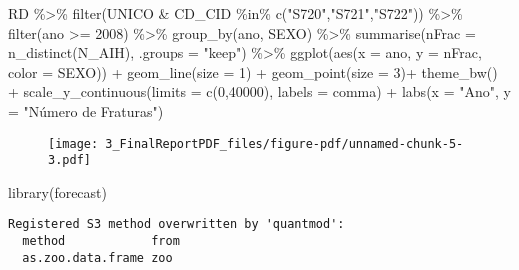 \documentclass[
  letterpaper,
  DIV=11,
  numbers=noendperiod]{scrartcl}
\newenvironment{Shaded}{\begin{snugshade}}{\end{snugshade}}
\newcommand{\AttributeTok}[1]{\textcolor[rgb]{0.40,0.45,0.13}{#1}}
\newcommand{\DecValTok}[1]{\textcolor[rgb]{0.68,0.00,0.00}{#1}}
\newcommand{\FunctionTok}[1]{\textcolor[rgb]{0.28,0.35,0.67}{#1}}
\newcommand{\NormalTok}[1]{\textcolor[rgb]{0.00,0.23,0.31}{#1}}
\newcommand{\SpecialCharTok}[1]{\textcolor[rgb]{0.37,0.37,0.37}{#1}}
\newcommand{\StringTok}[1]{\textcolor[rgb]{0.13,0.47,0.30}{#1}}
\begin{document}
\begin{Shaded}
\begin{Highlighting}[]
\NormalTok{RD }\SpecialCharTok{\%\textgreater{}\%} 
  \FunctionTok{filter}\NormalTok{(UNICO }\SpecialCharTok{\&}\NormalTok{ CD\_CID }\SpecialCharTok{\%in\%} \FunctionTok{c}\NormalTok{(}\StringTok{"S720"}\NormalTok{,}\StringTok{"S721"}\NormalTok{,}\StringTok{"S722"}\NormalTok{)) }\SpecialCharTok{\%\textgreater{}\%} 
  \FunctionTok{filter}\NormalTok{(ano }\SpecialCharTok{\textgreater{}=} \DecValTok{2008}\NormalTok{) }\SpecialCharTok{\%\textgreater{}\%} 
  \FunctionTok{group\_by}\NormalTok{(ano, SEXO) }\SpecialCharTok{\%\textgreater{}\%} 
  \FunctionTok{summarise}\NormalTok{(}\AttributeTok{nFrac =} \FunctionTok{n\_distinct}\NormalTok{(N\_AIH), }\AttributeTok{.groups =} \StringTok{"keep"}\NormalTok{) }\SpecialCharTok{\%\textgreater{}\%} 
  \FunctionTok{ggplot}\NormalTok{(}\FunctionTok{aes}\NormalTok{(}\AttributeTok{x =}\NormalTok{ ano, }\AttributeTok{y =}\NormalTok{ nFrac, }\AttributeTok{color =}\NormalTok{ SEXO)) }\SpecialCharTok{+}
        \FunctionTok{geom\_line}\NormalTok{(}\AttributeTok{size =} \DecValTok{1}\NormalTok{) }\SpecialCharTok{+}
        \FunctionTok{geom\_point}\NormalTok{(}\AttributeTok{size =} \DecValTok{3}\NormalTok{)}\SpecialCharTok{+}
        \FunctionTok{theme\_bw}\NormalTok{() }\SpecialCharTok{+}
        \FunctionTok{scale\_y\_continuous}\NormalTok{(}\AttributeTok{limits =} \FunctionTok{c}\NormalTok{(}\DecValTok{0}\NormalTok{,}\DecValTok{40000}\NormalTok{), }\AttributeTok{labels =}\NormalTok{ comma) }\SpecialCharTok{+}
        \FunctionTok{labs}\NormalTok{(}\AttributeTok{x =} \StringTok{"Ano"}\NormalTok{, }\AttributeTok{y =} \StringTok{"Número de Fraturas"}\NormalTok{)}
\end{Highlighting}
\end{Shaded}

\begin{figure}[H]

{\centering \texttt{[image: 3\_FinalReportPDF\_files/figure-pdf/unnamed-chunk-5-3.pdf]}

}

\end{figure}

\begin{Shaded}
\begin{Highlighting}[]
\FunctionTok{library}\NormalTok{(forecast)}
\end{Highlighting}
\end{Shaded}

\begin{verbatim}
Registered S3 method overwritten by 'quantmod':
  method            from
  as.zoo.data.frame zoo 
\end{verbatim}
\end{document}
